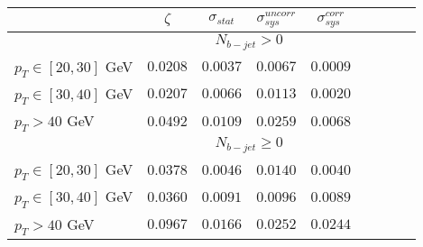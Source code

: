 \begin{tabular}{|l||c|c|c|c||c|c|c|c|}
\hline
 & $\zeta$ & $\sigma_{stat}$ & $\sigma_{sys}^{uncorr}$ & $\sigma_{sys}^{corr}$\\ 
\hline\hline
&\multicolumn{4}{c||}{$N_{b-jet} > 0$}\\ \hline
$p_{T}\in[20,30]$ GeV &  $0.0208$ &  $0.0037$ &  $0.0067$ &  $0.0009$\\ 
$p_{T}\in[30,40]$ GeV &  $0.0207$ &  $0.0066$ &  $0.0113$ &  $0.0020$\\ 
$p_{T} > 40$ GeV &  $0.0492$ &  $0.0109$ &  $0.0259$ &  $0.0068$\\ 
\hline\hline &\multicolumn{4}{c||}{$N_{b-jet} \geq 0$}\\ \hline
$p_{T}\in[20,30]$ GeV &  $0.0378$ &  $0.0046$ &  $0.0140$ &  $0.0040$\\ 
$p_{T}\in[30,40]$ GeV &  $0.0360$ &  $0.0091$ &  $0.0096$ &  $0.0089$\\ 
$p_{T} > 40$ GeV &  $0.0967$ &  $0.0166$ &  $0.0252$ &  $0.0244$\\ 
\hline
\end{tabular}

